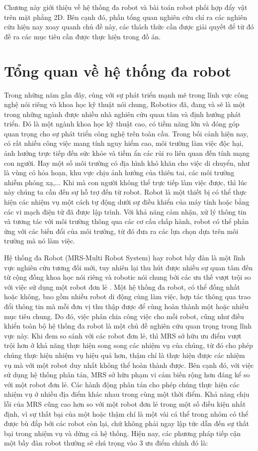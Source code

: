 Chương này giới thiệu về hệ thống đa robot và bài toán robot phối hợp đẩy vật trên mặt phẳng 2D. Bên cạnh đó, phần tổng quan nghiên cứu chỉ ra các nghiên cứu hiện nay xoay quanh chủ đề này, các thách thức cần được giải quyết để từ đó đề ra các mục tiêu cần được thực hiện trong đồ án.
 
\section{Tổng quan về hệ thống đa robot}
Trong những năm gần đây, cùng với sự phát triển mạnh mẽ trong lĩnh vực công nghệ nói riêng và khoa học kỹ thuật nói chung, Robotics đã, đang và sẽ là một trong những ngành được nhiều nhà nghiên cứu quan tâm và định hướng phát triển. Đó là một ngành khoa học kỹ thuật cao, có tiềm năng lớn và đóng góp quan trọng cho sự phát triển công nghệ trên toàn cầu. Trong bối cảnh hiện nay, có rất nhiều công việc mang tính nguy hiểm cao, môi trường làm việc độc hại, ảnh hưởng trực tiếp đến sức khỏe và tiềm ẩn các rủi ro liên quan đến tính mạng con người. Hay một số môi trường có địa hình khó khăn cho việc di chuyển, như là vùng có hỏa hoạn, khu vực chịu ảnh hưởng của thiên tai, các môi trường nhiễm phóng xạ,... Khi mà con người không thể trực tiếp làm việc được, thì lúc này chúng ta cần đến sự hỗ trợ đến từ robot. Robot là một thiết bị có thể thực hiện các nhiệm vụ một cách tự động dưới sự điều khiển của máy tính hoặc bằng các vi mạch điện tử đã được lập trình. Với khả năng cảm nhận, xử lý thông tin và tương tác với môi trường thông qua các cơ cấu chấp hành, robot có thể phản ứng với các biến đổi của môi trường, từ đó đưa ra các lựa chọn dựa trên môi trường mà nó làm việc.

Hệ thống đa Robot (MRS-Multi Robot System) hay robot bầy đàn \cite{6304778,U.Lima2005} là một lĩnh vực nghiên cứu tương đối mới, tuy nhiên lại thu hút được nhiều sự quan tâm đến từ cộng đồng khoa học nói riêng và robotic nói chung bởi các ưu thế vượt trội so với việc sử dụng một robot đơn lẻ \cite{10.1145/3303848}. Một hệ thống đa robot, có thể đồng nhất hoặc không, bao gồm nhiều robot di động cùng làm việc, hợp tác thông qua trao đổi thông tin mà mỗi đơn vị thu thập được để cùng hoàn thành một hoặc nhiều mục tiêu chung. Do đó, việc phân chia công việc cho mỗi robot, cũng như điều khiển toàn bộ hệ thống đa robot là một chủ đề nghiên cứu quan trọng trong lĩnh vực này. Khi đem so sánh với các robot đơn lẻ, thì MRS sở hữu ưu điểm vượt trội hơn ở khả năng thực hiện song song các nhiệm vụ của chúng, từ đó cho phép chúng thực hiện nhiệm vụ hiệu quả hơn, thậm chí là thực hiện được các nhiệm vụ mà với một robot duy nhất không thể hoàn thành được. Bên cạnh đó, với việc sử dụng hệ thống phân tán, MRS sở hữu phạm vi cảm biến rộng hơn đáng kể so với một robot đơn lẻ. Các hành động phân tán cho phép chúng thực hiện các nhiệm vụ ở nhiều địa điểm khác nhau trong cùng một thời điểm. Khả năng chịu lỗi của MRS cũng cao hơn so với một robot đơn lẻ trong một số điều kiện nhất định, vì sự thất bại của một hoặc thậm chí là một vài cá thể trong nhóm có thể được bù đắp bởi các robot còn lại, chứ không phải ngay lập tức dẫn đến sự thất bại trong nhiệm vụ và dừng cả hệ thống. Hiện nay, các phương pháp tiếp cận một bầy đàn robot thường sẽ chú trọng vào 3 ưu điểm chính đó là:

